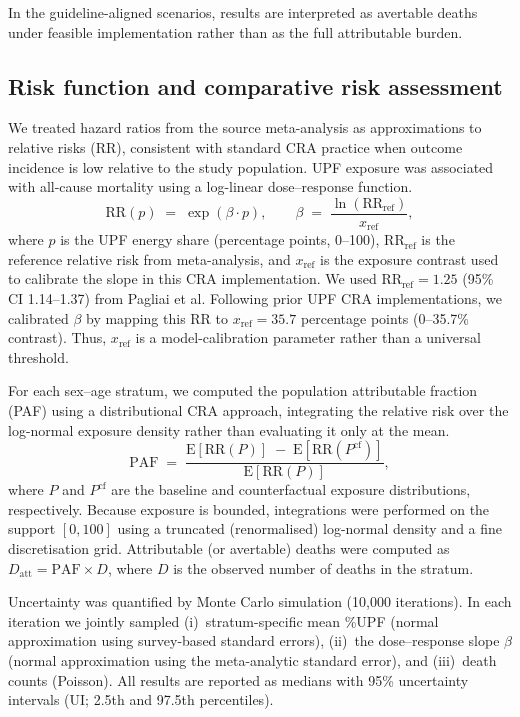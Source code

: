 ﻿\documentclass{article}
\begin{document}
In the guideline-aligned scenarios, results are interpreted as avertable deaths under feasible implementation rather than as the full attributable burden.

\subsection{Risk function and comparative risk assessment}

We treated hazard ratios from the source meta-analysis as approximations to relative risks (RR), consistent with standard CRA practice when outcome incidence is low relative to the study population.\cite{Murray2003} UPF exposure was associated with all-cause mortality using a log-linear dose--response function.
%
\begin{equation}
\text{RR}(p) \;=\; \exp(\beta \cdot p), \qquad \beta \;=\; \frac{\ln(\text{RR}_{\text{ref}})}{x_{\text{ref}}},
\end{equation}
%
where $p$ is the UPF energy share (percentage points, 0--100), $\text{RR}_{\text{ref}}$ is the reference relative risk from meta-analysis, and $x_{\text{ref}}$ is the exposure contrast used to calibrate the slope in this CRA implementation. We used $\text{RR}_{\text{ref}} = 1.25$ (95\% CI 1.14--1.37) from Pagliai et al.\cite{Pagliai2021} Following prior UPF CRA implementations,\cite{Nilson2023} we calibrated $\beta$ by mapping this RR to $x_{\text{ref}} = 35.7$ percentage points (0--35.7\% contrast). Thus, $x_{\text{ref}}$ is a model-calibration parameter rather than a universal threshold.

For each sex--age stratum, we computed the population attributable fraction (PAF) using a distributional CRA approach, integrating the relative risk over the log-normal exposure density rather than evaluating it only at the mean.
%
\begin{equation}
\text{PAF} \;=\; \frac{\text{E}[\text{RR}(P)] \;-
\; \text{E}[\text{RR}(P^{\text{cf}})]}{\text{E}[\text{RR}(P)]},
\end{equation}
%
where $P$ and $P^{\text{cf}}$ are the baseline and counterfactual exposure distributions, respectively. Because exposure is bounded, integrations were performed on the support $[0,100]$ using a truncated (renormalised) log-normal density and a fine discretisation grid. Attributable (or avertable) deaths were computed as $D_{\text{att}} = \text{PAF} \times D$, where $D$ is the observed number of deaths in the stratum.

Uncertainty was quantified by Monte Carlo simulation (10,000 iterations). In each iteration we jointly sampled (i)~stratum-specific mean \%UPF (normal approximation using survey-based standard errors), (ii)~the dose--response slope $\beta$ (normal approximation using the meta-analytic standard error), and (iii)~death counts (Poisson). All results are reported as medians with 95\% uncertainty intervals (UI; 2.5th and 97.5th percentiles).
\end{document}
